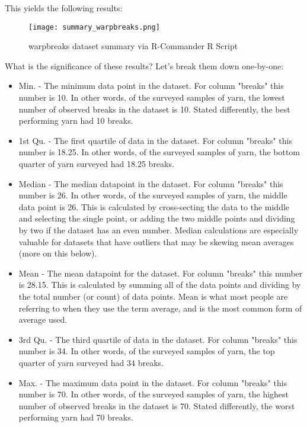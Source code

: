 This yields the following results:

\begin{figure}[h!]
\texttt{[image: summary\_warpbreaks.png]}
 \caption{warpbreaks dataset summary via R-Commander R Script}
 \label{fig:summary_warpbreaks}
\end{figure}

What is the significance of these results? Let's break them down one-by-one:

\begin{itemize}
 \item Min. - The minimum data point in the dataset. For column "breaks" this number is 10. In other words, of the surveyed samples of yarn, the lowest number of observed breaks in the dataset is 10. Stated differently, the best performing yarn had 10 breaks.
 \item 1st Qu. - The first quartile of data in the dataset. For column "breaks" this number is 18.25. In other words, of the surveyed samples of yarn, the bottom quarter of yarn surveyed had 18.25 breaks.
 \item Median - The median datapoint in the dataset. For column "breaks" this number is 26. In other words, of the surveyed samples of yarn, the middle data point is 26. This is calculated by cross-secting the data to the middle and selecting the single point, or adding the two middle points and dividing by two if the dataset has an even number. Median calculations are especially valuable for datasets that have outliers that may be skewing mean averages (more on this below).
 \item Mean - The mean datapoint for the dataset. For column "breaks" this number is 28.15. This is calculated by summing all of the data points and dividing by the total number (or count) of data points. Mean is what most people are referring to when they use the term average, and is the most common form of average used.
 \item 3rd Qu. - The third quartile of data in the dataset. For column "breaks" this number is 34. In other words, of the surveyed samples of yarn, the top quarter of yarn surveyed had 34 breaks.
 \item Max. - The maximum data point in the dataset. For column "breaks" this number is 70. In other words, of the surveyed samples of yarn, the highest number of observed breaks in the dataset is 70. Stated differently, the worst performing yarn had 70 breaks.
\end{itemize}

